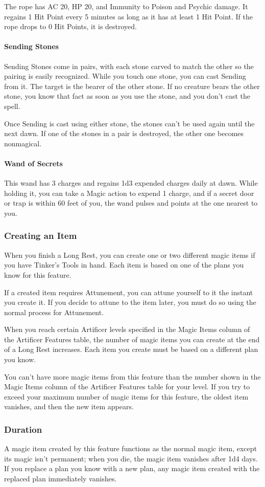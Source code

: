 \documentclass[letterpaper,openany,oneside,twocolumn]{book}
\begin{document}
The rope has AC 20, HP 20, and Immunity to Poison and Psychic damage. It regains 1 Hit Point every 5 minutes as long as it has at least 1 Hit Point. If the rope drops to 0 Hit Points, it is destroyed.
\paragraph*{Sending Stones} Sending Stones come in pairs, with each stone carved to match the other so the pairing is easily recognized. While you touch one stone, you can cast Sending from it. The target is the bearer of the other stone. If no creature bears the other stone, you know that fact as soon as you use the stone, and you don't cast the spell.

Once Sending is cast using either stone, the stones can't be used again until the next dawn. If one of the stones in a pair is destroyed, the other one becomes nonmagical.
\paragraph*{Wand of Secrets} This wand has 3 charges and regains 1d3 expended charges daily at dawn. While holding it, you can take a Magic action to expend 1 charge, and if a secret door or trap is within 60 feet of you, the wand pulses and points at the one nearest to you.
\subsubsection*{Creating an Item}
When you finish a Long Rest, you can create one or two different magic items if you have Tinker's Tools in hand. Each item is based on one of the plans you know for this feature.

If a created item requires Attunement, you can attune yourself to it the instant you create it. If you decide to attune to the item later, you must do so using the normal process for Attunement.

When you reach certain Artificer levels specified in the Magic Items column of the Artificer Features table, the number of magic items you can create at the end of a Long Rest increases. Each item you create must be based on a different plan you know.

You can't have more magic items from this feature than the number shown in the Magic Items column of the Artificer Features table for your level. If you try to exceed your maximum number of magic items for this feature, the oldest item vanishes, and then the new item appears.
\subsubsection*{Duration}
A magic item created by this feature functions as the normal magic item, except its magic isn't permanent; when you die, the magic item vanishes after 1d4 days. If you replace a plan you know with a new plan, any magic item created with the replaced plan immediately vanishes.
\end{document}
